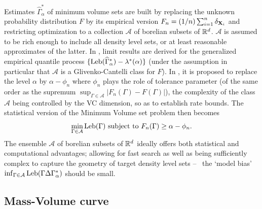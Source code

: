 Estimates $\widehat{\Gamma}^*_{\alpha}$ of minimum volume sets are built by replacing the unknown probability distribution $F$ by its empirical version $F_n=(1/n)\sum_{i=1}^n\delta_{\mathbf X_i}$ and restricting optimization to a collection $\mathcal{A}$ of borelian subsets of $\mathbb{R}^d$.  $\mathcal{A}$ is  assumed to be rich enough to include all density level sets, or at least reasonable approximates of the latter. 
In \cite{Polonik97}, limit results are derived for the generalized empirical quantile process $\{\text{Leb}(\widehat{\Gamma}^*_{\alpha})-\lambda^*(\alpha)\}$ (under the assumption in particular that $\mathcal{A}$ is a Glivenko-Cantelli class for $F$). In \cite{Scott2006}, it is proposed to replace the level $\alpha$ by $\alpha-\phi_n$ where $\phi_n$ plays the role of tolerance parameter (of the same order as the supremum $\sup_{\Gamma\in \mathcal{A}}\vert F_n(\Gamma)-F(\Gamma) \vert$), the complexity of the class $\mathcal{A}$ being controlled by the {\sc VC} dimension, so as to establish rate bounds. The statistical version of the Minimum Volume set problem then becomes
$$
\min_{\Gamma \in \mathcal{A}} \text{Leb}(\Gamma) \mbox{ subject to } F_n (\Gamma) \ge \alpha - \phi_n.
$$
The ensemble $\mathcal{A}$ of borelian subsets of $\mathbb{R}^d$ ideally offers both statistical and computational advantages; allowing for fast search as well as being sufficiently complex to capture the geometry of target density level sets -- \ie~the `model bias' $\inf_{\Gamma \in \mathcal{A}} \text{Leb}(\Gamma \Delta \Gamma^*_\alpha )$ should be small.


\subsection{Mass-Volume curve}
\label{resume:mv-curve}

